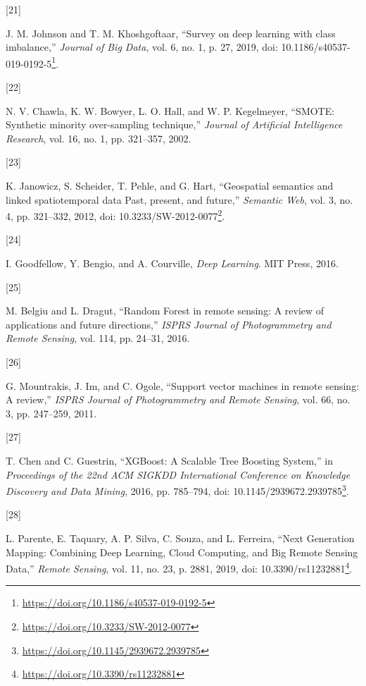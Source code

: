 \documentclass[
  11pt,
]{report}
\newlength{\cslhangindent}
\newlength{\csllabelwidth}
\newlength{\cslentryspacingunit} %
\newenvironment{CSLReferences}[2] %
 {%
  \setlength{\parindent}{0pt}
  \ifodd #1
  \let\oldpar\par
  \def\par{\hangindent=\cslhangindent\oldpar}
  \fi
  \setlength{\parskip}{#2\cslentryspacingunit}
 }%
 {}
\newcommand{\CSLLeftMargin}[1]{\parbox[t]{\csllabelwidth}{#1}}
\newcommand{\CSLRightInline}[1]{\parbox[t]{\linewidth - \csllabelwidth}{#1}\break}
\renewcommand{\href}[2]{#2\footnote{\url{#1}}}
\begin{document}
\begin{CSLReferences}{0}{0}
\leavevmode{}%
\CSLLeftMargin{{[}21{]} }%
\CSLRightInline{J. M. Johnson and T. M. Khoshgoftaar, {``Survey on deep
learning with class imbalance,''} \emph{Journal of Big Data}, vol. 6,
no. 1, p. 27, 2019, doi:
\href{https://doi.org/10.1186/s40537-019-0192-5}{10.1186/s40537-019-0192-5}.}

\leavevmode{}%
\CSLLeftMargin{{[}22{]} }%
\CSLRightInline{N. V. Chawla, K. W. Bowyer, L. O. Hall, and W. P.
Kegelmeyer, {``{SMOTE}: Synthetic minority over-sampling technique,''}
\emph{Journal of Artificial Intelligence Research}, vol. 16, no. 1, pp.
321--357, 2002.}

\leavevmode{}%
\CSLLeftMargin{{[}23{]} }%
\CSLRightInline{K. Janowicz, S. Scheider, T. Pehle, and G. Hart,
{``Geospatial semantics and linked spatiotemporal data \textendash{}
{Past}, present, and future,''} \emph{Semantic Web}, vol. 3, no. 4, pp.
321--332, 2012, doi:
\href{https://doi.org/10.3233/SW-2012-0077}{10.3233/SW-2012-0077}.}

\leavevmode{}%
\CSLLeftMargin{{[}24{]} }%
\CSLRightInline{I. Goodfellow, Y. Bengio, and A. Courville, \emph{Deep
{Learning}}. {MIT Press}, 2016.}

\leavevmode{}%
\CSLLeftMargin{{[}25{]} }%
\CSLRightInline{M. Belgiu and L. Dragut, {``Random {Forest} in remote
sensing: {A} review of applications and future directions,''}
\emph{ISPRS Journal of Photogrammetry and Remote Sensing}, vol. 114, pp.
24--31, 2016.}

\leavevmode{}%
\CSLLeftMargin{{[}26{]} }%
\CSLRightInline{G. Mountrakis, J. Im, and C. Ogole, {``Support vector
machines in remote sensing: {A} review,''} \emph{ISPRS Journal of
Photogrammetry and Remote Sensing}, vol. 66, no. 3, pp. 247--259, 2011.}

\leavevmode{}%
\CSLLeftMargin{{[}27{]} }%
\CSLRightInline{T. Chen and C. Guestrin, {``{XGBoost}: {A Scalable Tree
Boosting System},''} in \emph{Proceedings of the 22nd {ACM SIGKDD
International Conference} on {Knowledge Discovery} and {Data Mining}},
2016, pp. 785--794, doi:
\href{https://doi.org/10.1145/2939672.2939785}{10.1145/2939672.2939785}.}

\leavevmode{}%
\CSLLeftMargin{{[}28{]} }%
\CSLRightInline{L. Parente, E. Taquary, A. P. Silva, C. Souza, and L.
Ferreira, {``Next {Generation Mapping}: {Combining Deep Learning},
{Cloud Computing}, and {Big Remote Sensing Data},''} \emph{Remote
Sensing}, vol. 11, no. 23, p. 2881, 2019, doi:
\href{https://doi.org/10.3390/rs11232881}{10.3390/rs11232881}.}


\end{CSLReferences}
\end{document}
